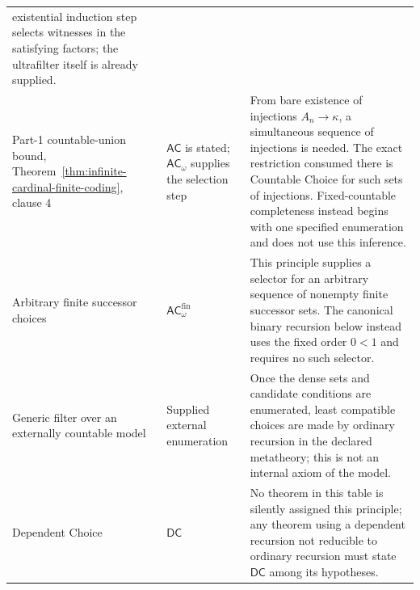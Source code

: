 \begin{longtable}{@{}p{}p{}p{}@{}}
existential induction step selects witnesses in the satisfying factors; the
ultrafilter itself is already supplied. \\
Part-1 countable-union bound,
Theorem~\ref{thm:infinite-cardinal-finite-coding}, clause 4 &
\(\mathsf{AC}\) is stated;
\(\mathsf{AC}_{\omega}\) supplies the selection step & From bare existence
of injections \(A_n\to\kappa\), a simultaneous sequence of injections is
needed.  The exact restriction consumed there is Countable Choice for such
sets of injections.  Fixed-countable completeness instead begins with one
specified enumeration and does not use this inference. \\
Arbitrary finite successor choices &
\(\mathsf{AC}_{\omega}^{\mathrm{fin}}\) & This principle supplies a selector
for an arbitrary sequence of nonempty finite successor sets.  The canonical
binary recursion below instead uses the fixed order \(0<1\) and requires no
such selector. \\
Generic filter over an externally countable model & Supplied external
enumeration & Once the dense sets and candidate conditions are enumerated,
least compatible choices are made by ordinary recursion in the declared
metatheory; this is not an internal axiom of the model. \\
Dependent Choice & \(\mathsf{DC}\) & No theorem in this table is silently
assigned this principle; any theorem using a dependent recursion not reducible
to ordinary recursion must state \(\mathsf{DC}\) among its hypotheses. \\
\bottomrule
\end{longtable}
\endgroup

